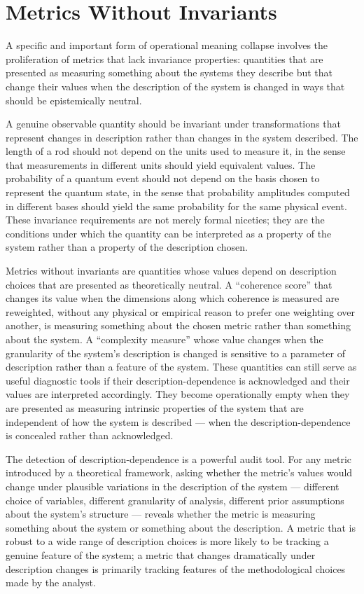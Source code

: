 \documentclass[12pt, openright, twoside]{book}
\begin{document}
\section{Metrics Without Invariants}

A specific and important form of operational meaning collapse
involves the proliferation of metrics that lack invariance
properties: quantities that are presented as measuring
something about the systems they describe but that change
their values when the description of the system is changed
in ways that should be epistemically neutral.

A genuine observable quantity should be invariant under
transformations that represent changes in description rather
than changes in the system described. The length of a rod
should not depend on the units used to measure it, in the
sense that measurements in different units should yield
equivalent values. The probability of a quantum event should
not depend on the basis chosen to represent the quantum state,
in the sense that probability amplitudes computed in different
bases should yield the same probability for the same physical
event. These invariance requirements are not merely formal
niceties; they are the conditions under which the quantity
can be interpreted as a property of the system rather than
a property of the description chosen.

Metrics without invariants are quantities whose values depend
on description choices that are presented as theoretically
neutral. A ``coherence score'' that changes its value when
the dimensions along which coherence is measured are
reweighted, without any physical or empirical reason to
prefer one weighting over another, is measuring something
about the chosen metric rather than something about the
system. A ``complexity measure'' whose value changes when
the granularity of the system's description is changed
is sensitive to a parameter of description rather than
a feature of the system. These quantities can still serve
as useful diagnostic tools if their description-dependence
is acknowledged and their values are interpreted accordingly.
They become operationally empty when they are presented
as measuring intrinsic properties of the system that are
independent of how the system is described --- when the
description-dependence is concealed rather than
acknowledged.

The detection of description-dependence is a powerful
audit tool. For any metric introduced by a theoretical
framework, asking whether the metric's values would change
under plausible variations in the description of the system
--- different choice of variables, different granularity
of analysis, different prior assumptions about the system's
structure --- reveals whether the metric is measuring
something about the system or something about the
description. A metric that is robust to a wide range
of description choices is more likely to be tracking
a genuine feature of the system; a metric that changes
dramatically under description changes is primarily
tracking features of the methodological choices made
by the analyst.
\end{document}
